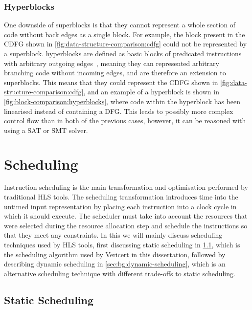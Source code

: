 \subsubsection{Hyperblocks}

One downside of \glspl{superblock} is that they cannot represent a whole section
of code without back edges as a single block.  For example, the block present in
the \gls{CDFG} shown in \cref{fig:data-structure-comparison:cdfg} could not be
represented by a \gls{superblock}.  \Glspl{hyperblock} are defined as
\glspl{basic block} of \glspl{predicated instruction} with arbitrary outgoing
edges~\cite[]{mahlke92_effec_compil_suppor_predic_execut_using_hyper}, meaning
they can represented arbitrary branching code without incoming edges, and are
therefore an extension to \glspl{superblock}.  This means that they could
represent the \gls{CDFG} shown in \cref{fig:data-structure-comparison:cdfg}, and
an example of a hyperblock is shown in \cref{fig:block-comparison:hyperblocks},
where code within the \gls{hyperblock} has been linearised instead of containing
a \gls{DFG}.  This leads to possibly more complex control flow than in both of
the previous cases, however, it can be reasoned with using a \gls{SAT} or
\gls{SMT} solver.

\section{Scheduling}%
\label{sec:bg:scheduling}

Instruction scheduling is the main transformation and optimisation performed by
traditional \gls{HLS} tools.  The scheduling transformation introduces time into
the untimed input representation by placing each instruction into a clock cycle
in which it should execute.  The scheduler must take into account the resources
that were selected during the resource allocation step and schedule the
instructions so that they meet any constraints.  In this
 we will mainly discuss scheduling techniques used
by \gls{HLS} tools, first discussing static scheduling in
\cref{sec:bg:static-scheduling}, which is the scheduling algorithm used by
Vericert in this dissertation, followed by describing \gls{dynamic scheduling}
in \cref{sec:bg:dynamic-scheduling}, which is an alternative scheduling
technique with different trade-offs to static scheduling.

\subsection{Static Scheduling}%
\label{sec:bg:static-scheduling}

